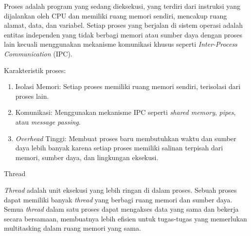 \documentclass[12pt]{article}
\begin{document}
	            Proses adalah program yang sedang dieksekusi, yang terdiri dari instruksi yang dijalankan oleh CPU dan memiliki ruang memori sendiri, mencakup ruang alamat, data, dan variabel. Setiap proses yang berjalan di sistem operasi adalah entitas independen yang tidak berbagi memori atau sumber daya dengan proses lain kecuali menggunakan mekanisme komunikasi khusus seperti \textit{Inter-Process Communication} (IPC).

	            Karakteristik proses:
	            \begin{enumerate}
		            \item Isolasi Memori: Setiap proses memiliki ruang memori sendiri, terisolasi dari proses lain.
		            \item Komunikasi: Menggunakan mekanisme IPC seperti \textit{shared memory}, \textit{pipes}, atau \textit{message passing}.
		            \item \textit{Overhead} Tinggi: Membuat proses baru membutuhkan waktu dan sumber daya lebih banyak karena setiap proses memiliki salinan terpisah dari memori, sumber daya, dan lingkungan eksekusi.
	            \end{enumerate}
	      \item Thread

	            \textit{Thread} adalah unit eksekusi yang lebih ringan di dalam proses. Sebuah proses dapat memiliki banyak \textit{thread} yang berbagi ruang memori dan sumber daya. Semua \textit{thread} dalam satu proses dapat mengakses data yang sama dan bekerja secara bersamaan, membuatnya lebih efisien untuk tugas-tugas yang memerlukan multitasking dalam ruang memori yang sama.
\end{document}
